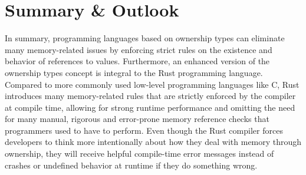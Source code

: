 \documentclass[sigplan,11pt,nonacm]{acmart}
\begin{document}








\section{Summary \& Outlook}
\label{sec:summary}

In summary, programming languages based on ownership types can eliminate many memory-related issues by enforcing strict rules on the existence and behavior of references to values.
Furthermore, an enhanced version of the ownership types concept is integral to the Rust programming language.
Compared to more commonly used low-level programming languages like C, Rust introduces many memory-related rules that are strictly enforced by the compiler at compile time, allowing for strong runtime performance and omitting the need for many manual, rigorous and error-prone memory reference checks that programmers used to have to perform.
Even though the Rust compiler forces developers to think more intentionally about how they deal with memory through ownership, they will receive helpful compile-time error messages instead of crashes or undefined behavior at runtime if they do something wrong.
\end{document}
